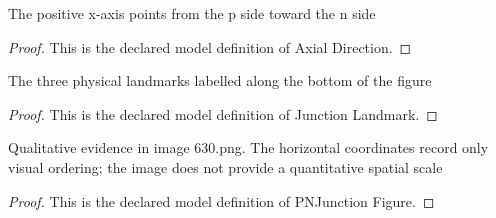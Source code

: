 \begin{definition}
  \label{def:physics:phyx-mini-0630:phyxminiproblems-problemphyxmini0630-axialdirection}
  The positive x-axis points from the p side toward the n side
\end{definition}
\begin{proof}
  This is the declared model definition of Axial Direction.
\end{proof}
\begin{definition}
  \label{def:physics:phyx-mini-0630:phyxminiproblems-problemphyxmini0630-junctionlandmark}
  The three physical landmarks labelled along the bottom of the figure
\end{definition}
\begin{proof}
  This is the declared model definition of Junction Landmark.
\end{proof}
\begin{definition}
  \label{def:physics:phyx-mini-0630:phyxminiproblems-problemphyxmini0630-pnjunctionfigure}
  Qualitative evidence in image 630.png. The horizontal coordinates record only visual ordering; the image does not provide a quantitative spatial scale
\end{definition}
\begin{proof}
  This is the declared model definition of PNJunction Figure.
\end{proof}
